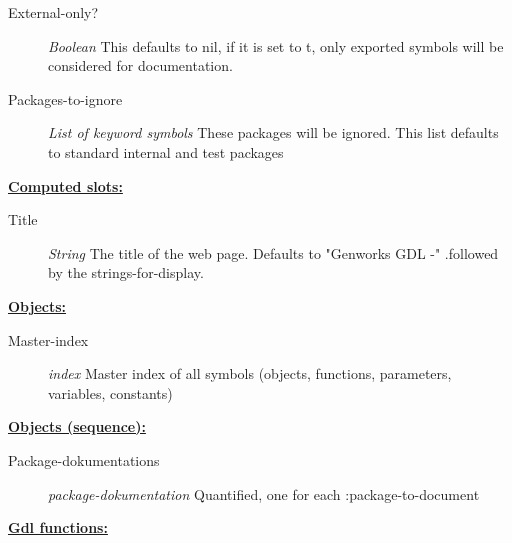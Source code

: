 \documentclass [11pt]{book}
\begin{document}
\begin{itemize}
\begin{description}
\item [External-only?]
\emph{Boolean} This defaults to nil, if it is set to t, only exported symbols will be
considered for documentation.


\item [Packages-to-ignore]
\emph{List of keyword symbols} These packages will be ignored.
This list defaults to standard internal and test packages


\end{description}






\textbf{
\underline{Computed slots:}}

\begin{description}

\item [Title]
\emph{String} The title of the web page. Defaults to "Genworks GDL -"
.followed by the strings-for-display.


\end{description}






\textbf{
\underline{Objects:}}

\begin{description}

\item [Master-index]
\emph{index} Master index of all symbols (objects, functions, parameters, variables, constants)


\end{description}






\textbf{
\underline{Objects (sequence):}}

\begin{description}

\item [Package-dokumentations]
\emph{package-dokumentation} Quantified, one for each :package-to-document


\end{description}






\textbf{
\underline{Gdl functions:}}

\begin{description}


\end{description}
\end{itemize}
\end{document}
